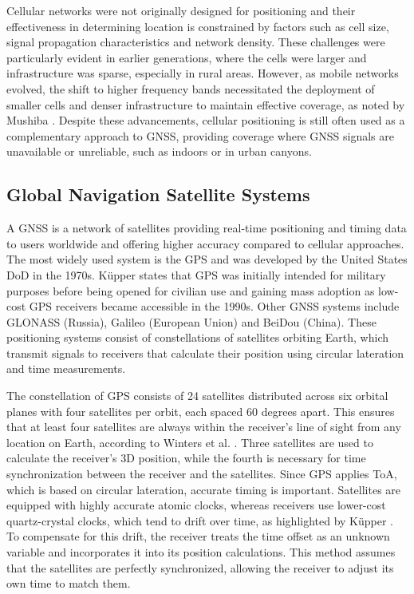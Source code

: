 Cellular networks were not originally designed for positioning and their effectiveness in determining location is constrained by factors such as cell size, signal propagation characteristics and network density. 
These challenges were particularly evident in earlier generations, where the cells were larger and infrastructure was sparse, especially in rural areas.
However, as mobile networks evolved, the shift to higher frequency bands necessitated the deployment of smaller cells and denser infrastructure to maintain effective coverage, as noted by Mushiba \cite{mushiba2024gsm}. 
Despite these advancements, cellular positioning is still often used as a complementary approach to \acs{GNSS}, providing coverage where \acs{GNSS} signals are unavailable or unreliable, such as indoors or in urban canyons.

\subsection{Global Navigation Satellite Systems}
\label{sec:gnss}
A \acs{GNSS} is a network of satellites providing real-time positioning and timing data to users worldwide and offering higher accuracy compared to cellular approaches.
The most widely used system is the \ac{GPS} and was developed by the United States \ac{DoD} in the 1970s.
K\"upper \cite{kupper2005location} states that \acs{GPS} was initially intended for military purposes before being opened for civilian use and gaining mass adoption as low-cost GPS receivers became accessible in the 1990s.
Other GNSS systems include GLONASS (Russia), Galileo (European Union) and BeiDou (China). 
These positioning systems consist of constellations of satellites orbiting Earth, which transmit signals to receivers that calculate their position using circular lateration and time measurements.

The constellation of \acs{GPS} consists of 24 satellites distributed across six orbital planes with four satellites per orbit, each spaced 60 degrees apart. 
This ensures that at least four satellites are always within the receiver's line of sight from any location on Earth, according to Winters et al. \cite{winters2008travel}.  
Three satellites are used to calculate the receiver's 3D position, while the fourth is necessary for time synchronization between the receiver and the satellites. 
Since \acs{GPS} applies \ac{ToA}, which is based on circular lateration, accurate timing is important. 
Satellites are equipped with highly accurate atomic clocks, whereas receivers use lower-cost quartz-crystal clocks, which tend to drift over time, as highlighted by K\"upper \cite{kupper2005location}. 
To compensate for this drift, the receiver treats the time offset as an unknown variable and incorporates it into its position calculations. 
This method assumes that the satellites are perfectly synchronized, allowing the receiver to adjust its own time to match them.  


